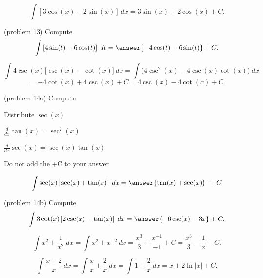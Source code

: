\documentclass[handout]{ximera}
\begin{document}
\begin{example}[example 13]
\[
\int \left[3\cos(x) - 2\sin(x)\right] \ dx = 3\sin(x) + 2\cos(x) + C.
\]
\end{example}


\begin{problem}(problem 13)
Compute
\[
\int \left[4\sin(t) - 6\cos(t)\right] \; dt = \answer{-4\cos(t) - 6\sin(t)} + C.
\]
\end{problem}

\begin{example}[example 14]
\[
\int 4\csc(x)\big[\csc(x) - \cot(x)\big] \ dx = \int \big(4\csc^2(x)  - 4\csc(x)\cot(x)\big) \ dx
\]
\[
 = -4\cot(x) + 4\csc(x) + C
= 4\csc(x) - 4 \cot(x) + C.
\]
\end{example}



\begin{problem}(problem 14a)
Compute

\begin{hint}
Distribute $\sec(x)$
\end{hint}
\begin{hint}
$\frac{d}{dx} \tan(x) = \sec^2(x)$
\end{hint}
\begin{hint}
$\frac{d}{dx} \sec(x) = \sec(x)\tan(x)$
\end{hint}
\begin{hint}
Do not add the +C to your answer
\end{hint}

\[
\int \sec(x)\big[\sec(x) + \tan(x) \big] \ dx =
\answer{\tan(x) + \sec(x)} \ +  C
\]
\end{problem}




\begin{problem}(problem 14b)
Compute
\[
\int 3\cot(x)\left[2\csc(x) - \tan(x)\right]\; dx = \answer{-6\csc(x) - 3x} + C.
\]
\end{problem}



\begin{example}[example 15]
\[
\int x^2 + \dfrac{1}{x^2} \ dx = \int x^2 + x^{-2} \ dx = \dfrac{x^3}{3} + \dfrac{x^{-1}}{-1} + C 
= \dfrac{x^3}{3} - \dfrac{1}{x} + C.
\]

\end{example}


\begin{example}[example 16]
\[
\int \dfrac{x+2}{x} \ dx = \int \dfrac{x}{x} + \dfrac{2}{x} \ dx = \int 1 + \dfrac{2}{x} \ dx = x + 2\ln|x| +C.
\]

\end{example}
\end{document}

